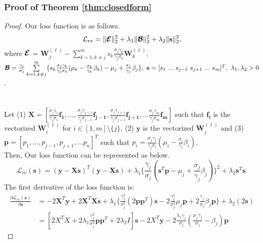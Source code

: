 \subsubsection{Proof of Theorem \ref{thm:closedform}}
\begin{proof}
Our loss function is as follows.
\small
\begin{equation}
     \mathcal{L}_{re} =  \|\boldsymbol{\mathcal{E}}\|_2^{2} + \lambda_1 \|\boldsymbol{\mathcal{B}}\|_2^{2} + \lambda_2 \|\mathbf{s}\|_{2}^{2},
\nonumber
\end{equation}
where $\boldsymbol{\mathcal{E}}$ = $\mathbf{W}_j^{(\ell)} - \sum\limits_{k = 1, k \neq j}^{m}s_k\frac{\sigma_{j}\gamma_{k}}{\gamma_{j}\sigma_{k}}\mathbf{W}_k^{(\ell)} $,~$\boldsymbol{\mathcal{B}} =\frac{\gamma_{j}}{\sigma_{j}}\sum\limits_{k = 1, k \neq j}^{m} \{s_k \frac{\sigma_{j}\gamma_{k}}{\gamma_{j}\sigma_{k}}(\mu_k - \frac{\sigma_{k}}{\gamma_{k}}\beta_k) - \mu_j +\frac{\sigma_{j}}{\gamma_{j}}\beta_j \},~\mathbf{s} =  [s_{1}~...~s_{j-1}~s_{j+1}~...~s_{m}]^T,~\lambda_1 , \lambda_2 > 0$. \\
\\
\\
Let (1) $\mathbf{X}=[\frac{\sigma_{j}\gamma_{1}}{\gamma_{j}\sigma_{1}}\boldsymbol{f_1},...,\frac{\sigma_{j}\gamma_{j-1}}{\gamma_{j}\sigma_{j-1}}\boldsymbol{f_{j-1}},\frac{\sigma_{j}\gamma_{j+1}}{\gamma_{j}\sigma_{j+1}}\boldsymbol{f_{j+1}},...\frac{\sigma_{j}\gamma_{m}}{\gamma_{j}\sigma_{m}}\boldsymbol{f_m}]$ such that $\boldsymbol{f_i}$ is the vectorized  $\mathbf{W}_i^{(\ell)}$ for $i \in [1,m] \setminus \{j\}$, (2) $\mathbf{y}$ is the vectorized $\mathbf{W}_j^{(\ell)}$ and (3) $\mathbf{p}=[p_1,...,p_{j-1}, p_{j+1}, ... p_n]^{T}$ such that $p_i = \frac{\sigma_{j}\gamma_{i}}{\gamma_{j}\sigma_{i}}(\mu_i - \frac{\sigma_{i}}{\gamma_{i}}\beta_i)$.\\
Then, Our loss function can be represented as below.
\begin{equation}
 \mathcal{L}_{re}(\mathbf{s}) = (\mathbf{y} - \mathbf{X}\mathbf{s})^{T}(\mathbf{y} - \mathbf{X}\mathbf{s}) + \lambda_1\{\frac{\gamma_{j}}{\sigma_{j}}(\mathbf{s}^{T}\mathbf{p} - \mu_j + \frac{\sigma_{j}}{\gamma_{j}}\beta_j)\}^2 + \lambda_2\mathbf{s}^T\mathbf{s}.
    \nonumber
\end{equation}
The first derivative of the loss function is: 
\begin{equation}
\begin{split}
\frac{\partial\mathcal{L}_{re}(\mathbf{s})}{\partial\mathbf{s}} &=  -2\mathbf{X}^T\mathbf{y} + 2\mathbf{X}^T\mathbf{X}\mathbf{s} + \lambda_1 \{\frac{\gamma_{j}^2}{\sigma_{j}^2}(2\mathbf{p}\mathbf{p}^T)\mathbf{s} - 2 \frac{\gamma_{j}^2}{\sigma_{j}^2}\mu_j\mathbf{p} + 2\frac{\gamma_{j}}{\sigma_{j}}\beta_j\mathbf{p}\} + \lambda_2(2\mathbf{s}) \\
&= [2X^{T}X+2\lambda_{1}\frac{\gamma_{j}^2}{\sigma_{j}^2}\boldsymbol{p}\boldsymbol{p}^{T}+2\lambda_{2}I]\mathbf{s} -2 X^{T}\boldsymbol{y}-2\frac{\lambda_{1}\gamma_{j}}{\sigma_{j}}(\frac{\mu_{j}\gamma_{j}}{\sigma_{j}}-\beta_{j})\boldsymbol{p}
\end{split}
 \nonumber
\end{equation}



\end{proof}
